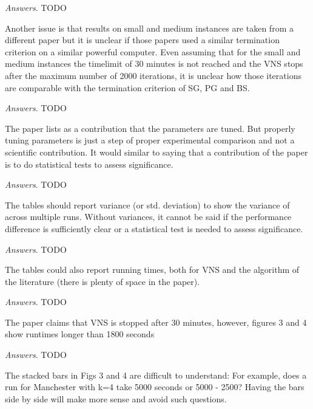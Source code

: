 \documentclass [11pt]{scrartcl}
\begin{document}
\emph{Answers}. TODO 


\begin{leftbar}
Another issue is that results on small and medium instances are taken from a different paper but it is unclear if those papers used a similar termination criterion on a similar powerful computer. Even assuming that for the small and medium instances the timelimit of 30 minutes is not reached and the VNS stops after the maximum number of 2000 iterations, it is unclear how those iterations are comparable with the termination criterion of SG, PG and BS.
\end{leftbar}

\emph{Answers}. TODO 
 
\begin{leftbar}
The paper lists as a contribution that the parameters are tuned. But properly tuning parameters is just a step of proper experimental comparison and not a scientific contribution. It would similar to saying that a contribution of the paper is to do statistical tests to assess significance.
\end{leftbar}

\emph{Answers}. TODO 

\begin{leftbar}
The tables should report variance (or std. deviation) to show the variance of across multiple runs. Without variances, it cannot be said if the performance difference is sufficiently clear or a statistical test is needed to assess significance.
\end{leftbar}

\emph{Answers}. TODO 

\begin{leftbar}
The tables could also report running times, both for VNS and the algorithm of the literature (there is plenty of space in the paper).
\end{leftbar}

\emph{Answers}. TODO 

\begin{leftbar}
The paper claims that VNS is stopped after 30 minutes, however, figures 3 and 4 show runtimes longer than 1800 seconds
\end{leftbar}

\emph{Answers}. TODO 

\begin{leftbar}
The stacked bars in Figs 3 and 4 are difficult to understand: For example, does a run for Manchester with k=4 take 5000 seconds or 5000 - 2500? Having the bars side by side will make more sense and avoid such questions.	
\end{leftbar}
\end{document}
